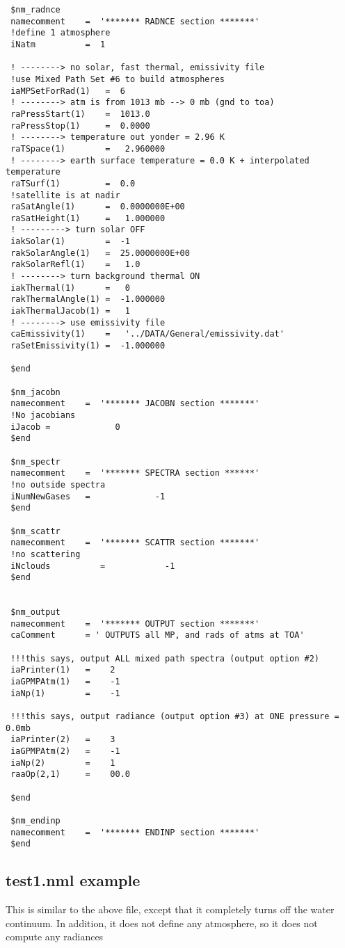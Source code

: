 \documentclass[11pt]{article}
\begin{document}
\begin{verbatim}
 $nm_radnce
 namecomment    =  '******* RADNCE section *******'
 !define 1 atmosphere
 iNatm          =  1

 ! --------> no solar, fast thermal, emissivity file
 !use Mixed Path Set #6 to build atmospheres
 iaMPSetForRad(1)   =  6
 ! --------> atm is from 1013 mb --> 0 mb (gnd to toa)
 raPressStart(1)    =  1013.0
 raPressStop(1)     =  0.0000
 ! --------> temperature out yonder = 2.96 K
 raTSpace(1)        =   2.960000
 ! --------> earth surface temperature = 0.0 K + interpolated temperature
 raTSurf(1)         =  0.0
 !satellite is at nadir 
 raSatAngle(1)      =  0.0000000E+00
 raSatHeight(1)     =   1.000000
 ! ---------> turn solar OFF
 iakSolar(1)        =  -1
 rakSolarAngle(1)   =  25.0000000E+00
 rakSolarRefl(1)    =   1.0
 ! --------> turn background thermal ON
 iakThermal(1)      =   0
 rakThermalAngle(1) =  -1.000000
 iakThermalJacob(1) =   1
 ! --------> use emissivity file
 caEmissivity(1)    =   '../DATA/General/emissivity.dat'
 raSetEmissivity(1) =  -1.000000

 $end

 $nm_jacobn
 namecomment    =  '******* JACOBN section *******'
 !No jacobians
 iJacob =             0
 $end

 $nm_spectr
 namecomment    =  '******* SPECTRA section ******'
 !no outside spectra
 iNumNewGases   =             -1
 $end

 $nm_scattr
 namecomment    =  '******* SCATTR section *******'
 !no scattering
 iNclouds          =            -1
 $end


 $nm_output
 namecomment    =  '******* OUTPUT section *******'
 caComment      = ' OUTPUTS all MP, and rads of atms at TOA'

 !!!this says, output ALL mixed path spectra (output option #2)
 iaPrinter(1)   =    2
 iaGPMPAtm(1)   =    -1
 iaNp(1)        =    -1

 !!!this says, output radiance (output option #3) at ONE pressure = 0.0mb
 iaPrinter(2)   =    3
 iaGPMPAtm(2)   =    -1
 iaNp(2)        =    1
 raaOp(2,1)     =    00.0

 $end

 $nm_endinp
 namecomment    =  '******* ENDINP section *******'
 $end
\end{verbatim}

\subsection{test1.nml example}
This is similar to the above file, except that it completely turns off the
water continuum. In addition, it does not define any atmosphere, so it does not
compute any radiances
\end{document}

